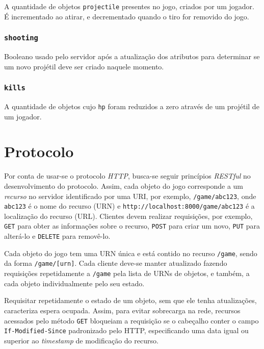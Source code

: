 \documentclass[12pt,a4paper]{article}
\begin{document}
A quantidade de objetos \texttt{projectile} presentes no jogo, criados por um
jogador. É incrementado ao atirar, e decrementado quando o tiro for removido do
jogo.

\subsubsection{\texttt{shooting}}

Booleano usado pelo servidor após a atualização dos atributos para determinar
se um novo projétil deve ser criado naquele momento.

\subsubsection{\texttt{kills}}

A quantidade de objetos cujo \texttt{hp} foram reduzidos a zero através de um
projétil de um jogador.

\pagebreak \section{Protocolo}

Por conta de usar-se o protocolo \textit{HTTP}, busca-se seguir princípios
\textit{RESTful} no desenvolvimento do protocolo. Assim, cada objeto do jogo
corresponde a um \textit{recurso} no servidor identificado por uma URI, por
exemplo, \texttt{/game/abc123}, onde \texttt{abc123} é o nome do recurso (URN)
e \texttt{http://localhost:8000/game/abc123} é a localização do recurso (URL).
Clientes devem realizar requisições, por exemplo, \texttt{GET} para obter as
informações sobre o recurso, \texttt{POST} para criar um novo, \texttt{PUT}
para alterá-lo e \texttt{DELETE} para removê-lo.

Cada objeto do jogo tem uma URN única e está contido no recurso \texttt{/game},
sendo da forma \texttt{/game/[urn]}. Cada cliente deve-se manter atualizado
fazendo requisições repetidamente a \texttt{/game} pela lista de URNs de
objetos, e também, a cada objeto individualmente pelo seu estado.

Requisitar repetidamente o estado de um objeto, sem que ele tenha atualizações,
caracteriza espera ocupada. Assim, para evitar sobrecarga na rede, recursos
acessados pelo método \texttt{GET} bloqueiam a requisição se o cabeçalho conter
o campo \texttt{If-Modified-Since} padronizado pelo HTTP, especificando uma
data igual ou superior ao \textit{timestamp} de modificação do recurso.
\end{document}
